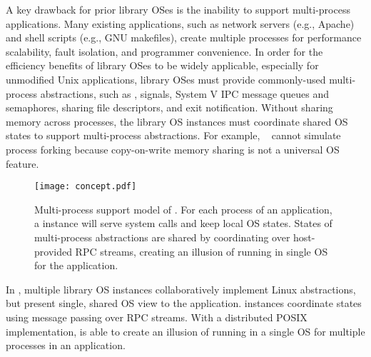 A key drawback for prior library OSes is the inability to support multi-process applications. Many existing applications, such as network servers (e.g., Apache) and shell scripts (e.g., GNU makefiles), create multiple processes for performance scalability, fault isolation, and programmer convenience.
In order for the efficiency benefits of library OSes to be widely applicable,
especially for unmodified Unix applications,
library OSes must provide commonly-used multi-process abstractions, such as , signals, System V IPC message queues and semaphores, sharing file descriptors, and exit notification.
Without sharing memory across processes, the library OS instances must coordinate shared OS states to support multi-process abstractions.
For example, \drawbridge{}~\cite{porter11drawbridge} cannot simulate process forking because copy-on-write memory sharing is not a universal OS feature.


\begin{figure}[t!]
\centering
\texttt{[image: concept.pdf]}
\caption{Multi-process support model of \graphene{} \libos{}. For each process of an application, a \libos{} instance will serve system calls and keep local OS states. States of multi-process abstractions are shared by coordinating over host-provided RPC streams, creating an illusion of running in single OS for the application.}
\label{fig:graphene:concept}
\end{figure}

In \graphene{}, multiple library OS instances collaboratively implement
Linux abstractions, but present single, shared OS view to the application.
\graphene{} instances coordinate states
using message passing over RPC streams.
With a distributed POSIX implementation,
\graphene{} is able to create an illusion of running in a single OS for multiple processes in an application.

